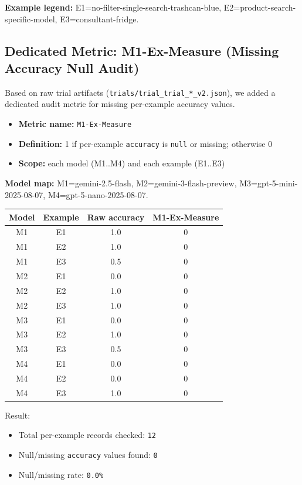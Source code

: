 \documentclass[11pt]{article}
\begin{document}
{\footnotesize
\textbf{Example legend:} E1=no-filter-single-search-trashcan-blue, E2=product-search-specific-model, E3=consultant-fridge.
}

\subsection{Dedicated Metric: M1-Ex-Measure (Missing Accuracy Null Audit)}

Based on raw trial artifacts (\texttt{trials/trial\_trial\_*\_v2.json}), we added a dedicated audit metric for missing per-example accuracy values.

\begin{itemize}
    \item \textbf{Metric name:} \texttt{M1-Ex-Measure}
    \item \textbf{Definition:} 1 if per-example \texttt{accuracy} is \texttt{null} or missing; otherwise 0
    \item \textbf{Scope:} each model (M1..M4) and each example (E1..E3)
\end{itemize}

{\footnotesize\textbf{Model map:} M1=gemini-2.5-flash, M2=gemini-3-flash-preview, M3=gpt-5-mini-2025-08-07, M4=gpt-5-nano-2025-08-07.}

\begin{table}[H]
\centering
\small
\setlength{\tabcolsep}{4pt}
\begin{tabular}{cccc}
\toprule
\textbf{Model} & \textbf{Example} & \textbf{Raw accuracy} & \textbf{M1-Ex-Measure} \\
\midrule
M1 & E1 & 1.0 & 0 \\
M1 & E2 & 1.0 & 0 \\
M1 & E3 & 0.5 & 0 \\
M2 & E1 & 0.0 & 0 \\
M2 & E2 & 1.0 & 0 \\
M2 & E3 & 1.0 & 0 \\
M3 & E1 & 0.0 & 0 \\
M3 & E2 & 1.0 & 0 \\
M3 & E3 & 0.5 & 0 \\
M4 & E1 & 0.0 & 0 \\
M4 & E2 & 0.0 & 0 \\
M4 & E3 & 1.0 & 0 \\
\bottomrule
\end{tabular}
\end{table}

Result:
\begin{itemize}
    \item Total per-example records checked: \texttt{12}
    \item Null/missing \texttt{accuracy} values found: \texttt{0}
    \item Null/missing rate: \texttt{0.0\%}
\end{itemize}
\end{document}
